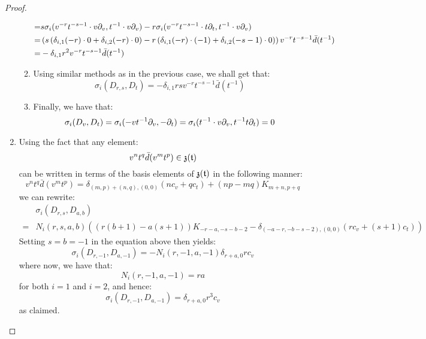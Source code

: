 \begin{proof}
\begin{enumerate}
\begin{enumerate}
$$\begin{aligned}
                                    = & s \sigma_i( v^{-r} t^{-s - 1} \cdot v \partial_v, t^{-1} \cdot v \partial_v ) - r\sigma_i( v^{-r} t^{-s - 1} \cdot t \partial_t, t^{-1} \cdot v \partial_v )
                                    \\
                                    = & \left( s \left( \delta_{i, 1} (-r) \cdot 0 + \delta_{i, 2} (-r) \cdot 0 \right) - r\left( \delta_{i, 1} (-r) \cdot (-1) + \delta_{i, 2} (-s - 1) \cdot 0 \right) \right) v^{-r} t^{-s - 1} \bar{d}(t^{-1}) 
                                    \\
                                    = & -\delta_{i, 1} r^2 v^{-r} t^{-s - 1} \bar{d}(t^{-1})
                                \end{aligned}
                            $$
                        \item Using similar methods as in the previous case, we shall get that:
                            $$\sigma_i(D_{r, s}, D_t) = -\delta_{i, 1} rs v^{-r} t^{-s - 1} \bar{d}(t^{-1})$$
                        \item Finally, we have that:
                            $$\sigma_i(D_v, D_t) = \sigma_i(-v t^{-1} \partial_v, -\partial_t) = \sigma_i(t^{-1} \cdot v \partial_v, t^{-1} t \partial_t) = 0$$
                    \end{enumerate}
                    \item Using the fact that any element:
                        $$v^n t^q \bar{d}(v^m t^p) \in \mathfrak{z}(\mathfrak{t})$$
                    can be written in terms of the basis elements of $\mathfrak{z}(\mathfrak{t})$ in the following manner:
                        $$v^n t^q \bar{d}(v^m t^p) = \delta_{(m, p) + (n, q), (0, 0)} ( n c_v + q c_t ) + (np - mq) K_{m + n, p + q}$$
                    we can rewrite:
                        $$
                            \begin{aligned}
                                & \sigma_i(D_{r, s}, D_{a, b})
                                \\
                                = & N_i(r, s, a, b) \left( ( r(b + 1) - a(s + 1) )K_{-r - a, -s - b - 2} - \delta_{ (-a - r, -b - s - 2), (0, 0) } (r c_v + (s + 1) c_t) \right)
                            \end{aligned}
                        $$
                    Setting $s = b = -1$ in the equation above then yields:
                        $$\sigma_i(D_{r, -1}, D_{a, -1}) = -N_i(r, -1, a, -1) \delta_{r + a, 0} r c_v$$
                    where now, we have that:
                        $$N_i(r, -1, a, -1) = ra$$
                    for both $i = 1$ and $i = 2$, and hence:
                        $$\sigma_i(D_{r, -1}, D_{a, -1}) = \delta_{r + a, 0} r^3 c_v$$
                    as claimed.
                \end{enumerate}
            \end{proof}

